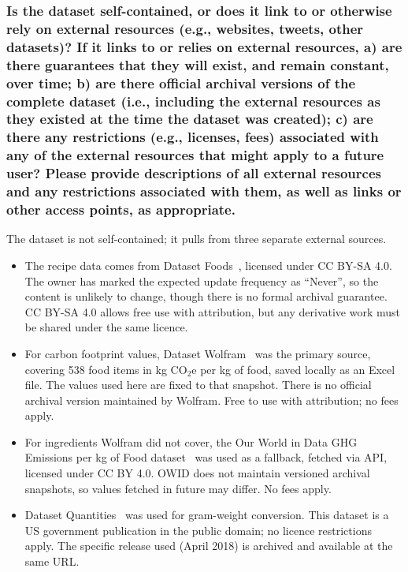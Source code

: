 \documentclass{article}
\newcommand{\question}[1]{#1}
\begin{document}
\question{\subsubsection*{Is the dataset self-contained, or does it link to or otherwise rely on external resources (e.g., websites, tweets, other datasets)? If it links to or relies on external resources, a) are there guarantees that they will exist, and remain constant, over time; b) are there official archival versions of the complete dataset (i.e., including the external resources as they existed at the time the dataset was created); c) are there any restrictions (e.g., licenses, fees) associated with any of the external resources that might apply to a future user? Please provide descriptions of all external resources and any restrictions associated with them, as well as links or other access points, as appropriate.}}

The dataset is not self-contained; it pulls from three separate external sources.

\begin{itemize}
    \item The recipe data comes from Dataset Foods~\cite{kaggle_southasian}, licensed under CC BY-SA 4.0. The owner has marked the expected update frequency as ``Never'', so the content is unlikely to change, though there is no formal archival guarantee. CC BY-SA 4.0 allows free use with attribution, but any derivative work must be shared under the same licence.
    \item For carbon footprint values, Dataset Wolfram~\cite{wolfram_carbon} was the primary source, covering 538 food items in kg CO$_2$e per kg of food, saved locally as an Excel file. The values used here are fixed to that snapshot. There is no official archival version maintained by Wolfram. Free to use with attribution; no fees apply.
    \item For ingredients Wolfram did not cover, the Our World in Data GHG Emissions per kg of Food dataset~\cite{owid_ghg} was used as a fallback, fetched via API, licensed under CC BY 4.0. OWID does not maintain versioned archival snapshots, so values fetched in future may differ. No fees apply.
    \item Dataset Quantities~\cite{usda_srlegacy} was used for gram-weight conversion. This dataset is a US government publication in the public domain; no licence restrictions apply. The specific release used (April 2018) is archived and available at the same URL.
\end{itemize}
\end{document}
